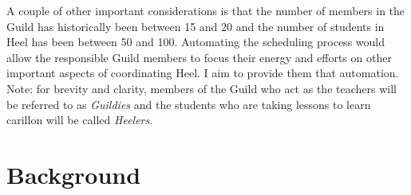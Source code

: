 \documentclass[letterpaper]{article}
\begin{document}
A couple of other important considerations is that the number of members in the Guild has historically been between 15
and 20 and the number of students in Heel has been between 50 and 100. Automating the scheduling process would allow the
responsible Guild members to focus their energy and efforts on other important aspects of coordinating Heel. I aim to
provide them that automation. Note: for brevity and clarity, members of the Guild who act as the teachers will be referred to
as \textit{Guildies} and the students who are taking lessons to learn carillon will be called \textit{Heelers}.

\section{Background}
\end{document}
